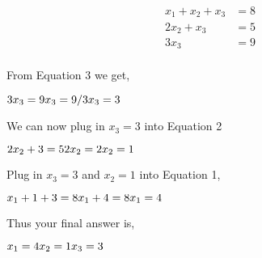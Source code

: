\documentclass{article}
\begin{document}
    \begin{align}
        x_1 + x_2 + x_3 & = 8 \\ %
        2x_2 + x_3 & = 5 \\ %
        3x_3 & = 9 \\ %
    \end{align}

\raggedright From Equation 3 we get, \newline

    \begin{math}
         3x_3 = 9 
         \newline %
         x_3 = 9/3 
         \newline
         x_3 = 3
    \end{math} \newline

\raggedright We can now plug in  \begin{math} x_3 = 3 \end{math} into Equation 2 \newline

    \begin{math}
         2x_2 + 3 = 5  
         \newline 
         2x_2 = 2
         \newline
         x_2 = 1
    \end{math} \newline

\raggedright Plug in \begin{math} x_3 = 3 \end{math} and \begin{math} x_2 = 1 \end{math}  into Equation 1, \newline
    
    \begin{math}
        x_1 + 1 + 3 = 8 \newline
        x_1 + 4  = 8 \newline
        x_1 = 4  
    \end{math}

\raggedright Thus your final answer is, 

    \begin{math}
        x_1 = 4 \newline
        x_2 = 1 \newline
      x_3 = 3 
    \end{math}
\end{document}
